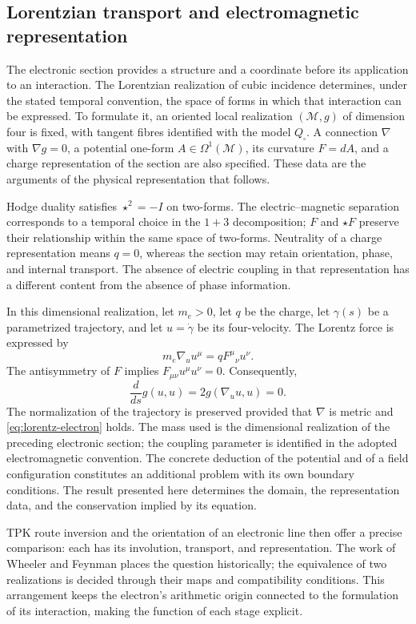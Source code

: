 \par
\subsection{Lorentzian transport and electromagnetic representation}

The electronic section provides a structure and a coordinate
before its application to an interaction. The Lorentzian realization
of cubic incidence determines, under the stated temporal convention,
the space of forms in which that interaction can be expressed.
To formulate it, an oriented local realization \((\mathcal M,g)\)
of dimension four is fixed, with tangent fibres identified with the model
\(Q_\square\). A connection \(\nabla\) with
\(\nabla g=0\), a potential one-form \(A\in\Omega^1(\mathcal M)\),
its curvature \(F=dA\), and a charge representation of the section
are also specified. These data are the arguments of the physical representation
that follows.

Hodge duality satisfies \(\star^2=-I\) on two-forms.
The electric--magnetic separation corresponds to a temporal choice
in the \(1+3\) decomposition; \(F\) and \(\star F\) preserve their
relationship within the same space of two-forms. Neutrality of a
charge representation means \(q=0\), whereas the section may
retain orientation, phase, and internal transport. The absence of
electric coupling in that representation has a different content
from the absence of phase information.

In this dimensional realization, let \(m_e>0\), let \(q\) be the charge,
let \(\gamma(s)\) be a parametrized trajectory, and let \(u=\dot\gamma\)
be its four-velocity. The Lorentz force is expressed by
\begin{equation}
 m_e\nabla_u u^\mu=qF^\mu{}_{\nu}u^\nu.
 \label{eq:lorentz-electron}
\end{equation}
The antisymmetry of \(F\) implies
\(F_{\mu\nu}u^\mu u^\nu=0\). Consequently,
\[
 \frac{d}{ds}g(u,u)=2g(\nabla_u u,u)=0.
\]
The normalization of the trajectory is preserved provided that \(\nabla\)
is metric and \eqref{eq:lorentz-electron} holds. The mass used
is the dimensional realization of the preceding electronic section;
the coupling parameter is identified in the adopted electromagnetic
convention. The concrete deduction of the potential and of a field
configuration constitutes an additional problem with its own
boundary conditions. The result presented here determines the domain, the
representation data, and the conservation implied by its equation.

TPK route inversion and the orientation of an electronic line
then offer a precise comparison: each has its involution,
transport, and representation. The work of Wheeler and Feynman
places the question historically; the equivalence of two realizations
is decided through their maps and compatibility conditions.
This arrangement keeps the electron's arithmetic origin connected
to the formulation of its interaction, making the function
of each stage explicit.
